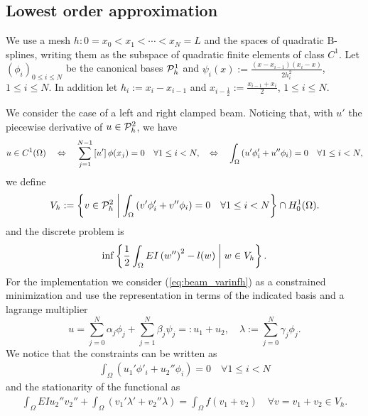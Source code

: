 \subsection{Lowest order approximation}\label{subsec:}
%
We use a mesh $h:0=x_0<x_1<\cdots< x_N=L$ and the spaces of quadratic B-splines, writing them as the subspace of quadratic finite elements of class $C^1$. Let $(\phi_i)_{0\le i\le N}$ be the canonical bases $\mathcal{P}^1_h$ and $\psi_i(x):=\frac{(x-x_{i-1})(x_i-x)}{2h_i^2}$, $1\le i\le N$.
In addition let $h_i:=x_i-x_{i-1}$ and $x_{i-\frac12}:= \frac{x_{i-1}+x_{i}}{2}$, $1\le i\le N$.

We consider the case of a left and right clamped beam. Noticing that, with $u'$ the piecewise derivative of $u\in \mathcal{P}^2_h$, we have
%
\begin{equation}\label{eq:beam_C1P2}
u\in C^1(\Omega) 
\quad\Leftrightarrow\quad \sum_{j=1}^{N-1} \left[u'\right]\phi(x_j)=0 \quad\forall 1\le i< N,
\quad\Leftrightarrow\quad \int_{\Omega} \left(u'\phi'_i + u''\phi_i\right)=0 \quad\forall 1\le i< N,
\end{equation}
%
we define
%
\begin{equation}\label{eq:beam_Vh}
V_h := \left\{v\in \mathcal{P}^2_h\;\middle|\;\int_{\Omega} \left(v'\phi'_i + v''\phi_i\right)=0 \quad\forall 1\le i< N\right\}\cap H^1_0(\Omega).
\end{equation}
%
and the discrete problem is
%
\begin{equation}\label{eq:beam_varinfh}
\inf\left\{\frac12\int_{\Omega}EI \left(w''\right)^2 - l(w)\;\middle|\;w\in V_h\right\}.
\end{equation}
%
For the implementation we consider (\ref{eq:beam_varinfh}) as a constrained minimization and use the representation in terms of the indicated basis and a lagrange multiplier
%
\begin{equation}\label{eq:}
u = \sum_{j=0}^N \alpha_j \phi_j +  \sum_{j=1}^N \beta_j \psi_j =: u_1 + u_2,\quad \lambda := \sum_{j=0}^N \gamma_j \phi_j.
\end{equation}
%
We notice that the constraints can be written as
%
\begin{align*}
\int_{\Omega} \left(u_1'\phi'_i + u_2''\phi_i\right)=0 \quad\forall 1\le i< N
\end{align*}
%
and the stationarity of the functional as
%
\begin{align*}
\int_{\Omega}EIu_2''v_2'' +  \int_{\Omega} \left(v_1'\lambda' + v_2''\lambda\right)=\int_{\Omega}f(v_1+v_2)\quad \forall v=v_1+v_2\in V_h.
\end{align*}
%


